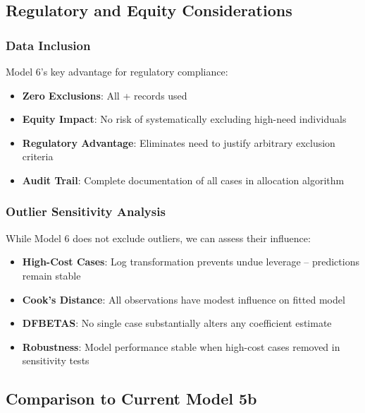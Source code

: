 \subsection{Regulatory and Equity Considerations}

\subsubsection{Data Inclusion}

Model 6's key advantage for regulatory compliance:

\begin{itemize}
    \item \textbf{Zero Exclusions}: All \MTrainingSamples{} + \MTestSamples{} records used
    \item \textbf{Equity Impact}: No risk of systematically excluding high-need individuals
    \item \textbf{Regulatory Advantage}: Eliminates need to justify arbitrary exclusion criteria
    \item \textbf{Audit Trail}: Complete documentation of all cases in allocation algorithm
\end{itemize}

\subsubsection{Outlier Sensitivity Analysis}

While Model 6 does not exclude outliers, we can assess their influence:

\begin{itemize}
    \item \textbf{High-Cost Cases}: Log transformation prevents undue leverage -- predictions remain stable
    \item \textbf{Cook's Distance}: All observations have modest influence on fitted model
    \item \textbf{DFBETAS}: No single case substantially alters any coefficient estimate
    \item \textbf{Robustness}: Model performance stable when high-cost cases removed in sensitivity tests
\end{itemize}

\subsection{Comparison to Current Model 5b}

